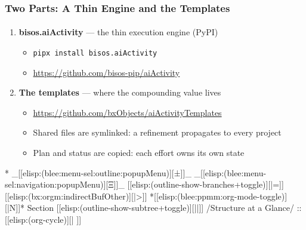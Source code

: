 \begin{whenOrg}
\begin{verblatex}
\begin{frame}[fragile,plain,label=twoParts]
    \frametitle{Two Parts: A Thin Engine and the Templates}
    \framesubtitle{}

\begin{enumerate}
  \item \textbf{bisos.aiActivity} --- the thin execution engine (PyPI)
    \begin{itemize}
    \item \texttt{pipx install bisos.aiActivity}
    \item \href{https://github.com/bisos-pip/aiActivity}{https://github.com/bisos-pip/aiActivity}
    \end{itemize}
  \item \textbf{The templates} --- where the compounding value lives
    \begin{itemize}
    \item \href{https://github.com/bxObjects/aiActivityTemplates}{https://github.com/bxObjects/aiActivityTemplates}
    \item Shared files are symlinked: a refinement propagates to every project
    \item Plan and status are copied: each effort owns its own state
    \end{itemize}
  \end{enumerate}


\end{frame}
\end{verblatex}



\begin{whenOrg}
*  _[[elisp:(blee:menu-sel:outline:popupMenu)][±]]_ _[[elisp:(blee:menu-sel:navigation:popupMenu)][Ξ]]_ [[elisp:(outline-show-branches+toggle)][|=]] [[elisp:(bx:orgm:indirectBufOther)][|>]] *[[elisp:(blee:ppmm:org-mode-toggle)][|N]]*  Section    [[elisp:(outline-show-subtree+toggle)][||]]   /Structure at a Glance/ ::  [[elisp:(org-cycle)][| ]]
\end{whenOrg}


\end{whenOrg}
